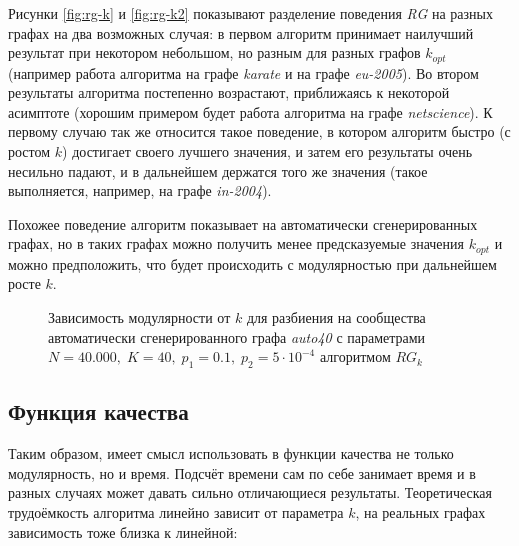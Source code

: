 Рисунки \ref{fig:rg-k} и \ref{fig:rg-k2} показывают разделение поведения \emph{RG} на разных графах на два возможных случая: в первом алгоритм принимает наилучший результат при некотором небольшом, но разным для разных графов $k_{opt}$ (например работа алгоритма на графе \emph{karate} и на графе \emph{eu-2005}). Во втором результаты алгоритма постепенно возрастают, приближаясь к некоторой асимптоте (хорошим примером будет работа алгоритма на графе \emph{netscience}). К первому случаю так же относится такое поведение, в котором алгоритм быстро (с ростом $k$) достигает своего лучшего значения, и затем его результаты очень несильно падают, и в дальнейшем держатся того же значения (такое выполняется, например, на графе \emph{in-2004}).

Похожее поведение алгоритм показывает на автоматически сгенерированных графах, но в таких графах можно получить менее предсказуемые значения $k_{opt}$ и можно предположить, что будет происходить с модулярностью при дальнейшем росте $k$.

\begin{figure}[H]
	\caption{Зависимость модулярности от $k$ для разбиения на сообщества автоматически сгенерированного графа \emph{auto40} с параметрами $N = 40.000,\;K = 40,\;p_1 = 0.1,\;p_2 = 5\cdot 10^{-4}$ алгоритмом $RG_k$}
	\label{fig:q-auto13}
\end{figure}



\subsection{Функция качества}
\label{subsec:arg-f}

Таким образом, имеет смысл использовать в функции качества не только модулярность, но и время. Подсчёт времени сам по себе занимает время и в разных случаях может давать сильно отличающиеся результаты. Теоретическая трудоёмкость алгоритма линейно зависит от параметра $k$, на реальных графах зависимость тоже близка к линейной:

